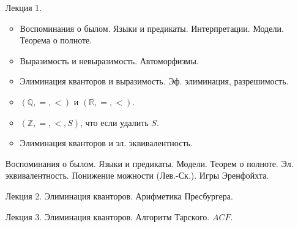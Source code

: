 \begin{enumerate}
    \item[Лекция 1.]
        \begin{itemize}
            \item Воспоминания о былом. Языки и предикаты. Интерпретации. Модели. Теорема о полноте. 
            \item Выразимость и невыразимость. Автоморфизмы.
            \item Элиминация кванторов и выразимость. Эф. элиминация, разрешимость.
            \item $(\mathbb{Q}, =, <)$ и $(\mathbb{R}, =, <)$.
            \item $(\mathbb{Z}, =, <, S)$, что если удалить $S$.
            \item Элиминация кванторов и эл. эквивалентность.
        \end{itemize}
        
        Воспоминания о былом. Языки и предикаты. Модели. Теорем о полноте.
        Эл. эквивалентность. Понижение можности (Лев.-Ск.). Игры Эренфойхта.
    \item[Лекция 2.] Элиминация кванторов. Арифметика Пресбургера.
    \item[Лекция 3.] Элиминация кванторов. Алгоритм Тарского. $ACF$.
\end{enumerate}